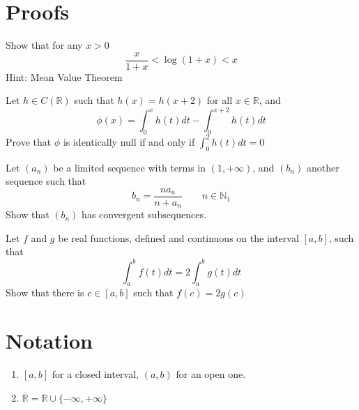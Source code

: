\documentclass[12pt]{article}
\begin{document}
\section{Proofs}
\begin{ExerciseList}
	\Exercise Show that for any $x>0$
	$$\frac{x}{1+x} < \log(1+x) < x$$
	Hint: Mean Value Theorem

	\Exercise Let $h\in C(\mathbb R)$ such that $h(x) = h(x+2)$ for all $x\in\mathbb R$, and
	$$\phi(x) = \int_0^x{h(t)dt}-\int_0^{x+2}{h(t)dt}$$
	Prove that $\phi$ is identically null if and only if $\int_0^2 h(t)dt = 0$

	\Exercise Let $(a_n)$ be a limited sequence with terms in $(1,+\infty)$, and
	$(b_n)$ another sequence such that $$b_n = \frac{na_n}{n+a_n}\qquad n\in\mathbb N_1$$
	Show that $(b_n)$ has convergent subsequences.

	\Exercise Let $f$ and $g$ be real functions, defined and continuous on the interval $[a,b]$, such that
	$$\int_a^b{f(t)}dt = 2\int_a^b{g(t)}dt$$
	Show that there is $c\in[a,b]$ such that $f(c)=2g(c)$
\end{ExerciseList}
\section{Notation}
\begin{enumerate}
	\item  $[a,b]$ for a closed interval, $(a,b)$ for an open one.
	\item $\overline{\mathbb R} = \mathbb R \cup \{-\infty, +\infty\}$
\end{enumerate}
\end{document}

